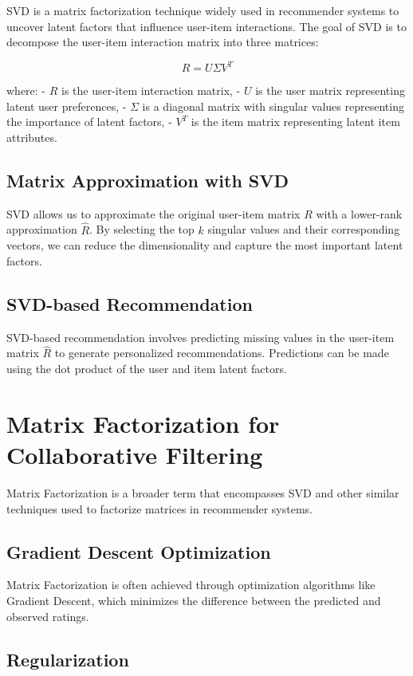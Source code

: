 \documentclass{article}
\begin{document}
SVD is a matrix factorization technique widely used in recommender systems to uncover latent factors that influence user-item interactions. The goal of SVD is to decompose the user-item interaction matrix into three matrices:

\[ R = U \Sigma V^T \]

where:
- $R$ is the user-item interaction matrix,
- $U$ is the user matrix representing latent user preferences,
- $\Sigma$ is a diagonal matrix with singular values representing the importance of latent factors,
- $V^T$ is the item matrix representing latent item attributes.

\subsection{Matrix Approximation with SVD}

SVD allows us to approximate the original user-item matrix $R$ with a lower-rank approximation $\hat{R}$. By selecting the top $k$ singular values and their corresponding vectors, we can reduce the dimensionality and capture the most important latent factors.

\subsection{SVD-based Recommendation}

SVD-based recommendation involves predicting missing values in the user-item matrix $\hat{R}$ to generate personalized recommendations. Predictions can be made using the dot product of the user and item latent factors.

\section{Matrix Factorization for Collaborative Filtering}

Matrix Factorization is a broader term that encompasses SVD and other similar techniques used to factorize matrices in recommender systems.

\subsection{Gradient Descent Optimization}

Matrix Factorization is often achieved through optimization algorithms like Gradient Descent, which minimizes the difference between the predicted and observed ratings.

\subsection{Regularization}
\end{document}
